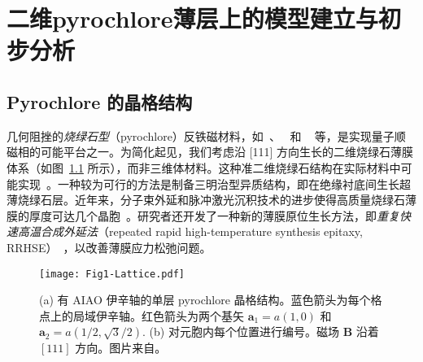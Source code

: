 \chapter{二维pyrochlore薄层上的模型建立与初步分析}
\label{chap:pyrochlore_model}
    \section{Pyrochlore 的晶格结构}
        几何阻挫的\emph{烧绿石型}（pyrochlore）反铁磁材料，如~\cite{welch2022MagneticStructure}、~\cite{kancko2023StructuralSpinglass} 和 ~\cite{he2021NeutronScattering} 等，是实现量子顺磁相的可能平台之一。为简化起见，我们考虑沿 [111] 方向生长的二维烧绿石薄膜体系（如图~\ref{fig:pyrochlore_lattice} 所示），而非三维体材料。这种准二维烧绿石结构在实际材料中可能实现~\cite{liu2024chiralspinliquidlikestatepyrochlore}。一种较为可行的方法是制备三明治型异质结构，即在绝缘衬底间生长超薄烧绿石层。近年来，分子束外延和脉冲激光沉积技术的进步使得高质量烧绿石薄膜的厚度可达几个晶胞~\cite{fujita2016AllinalloutMagnetic}。研究者还开发了一种新的薄膜原位生长方法，即\emph{重复快速高温合成外延法}（repeated rapid high-temperature synthesis epitaxy, RRHSE）~\cite{kim2019InoperandoSpectroscopic,kim2020StrainEngineeringMagnetic}，以改善薄膜应力松弛问题。

        \begin{figure}
            \centering
            \texttt{[image: Fig1-Lattice.pdf]}
            \caption{(a) 有 AIAO 伊辛轴的单层 pyrochlore 晶格结构。蓝色箭头为每个格点上的局域伊辛轴。红色箭头为两个基矢 $\bm{a}_1=a(1,0)$ 和 $\bm{a}_2=a(1/2,\sqrt{3}/2)$. (b) 对元胞内每个位置进行编号。磁场 $\bm{B}$ 沿着 $[111]$ 方向。图片来自\cite{lu2024Spin}。}
            \label{fig:pyrochlore_lattice}
        \end{figure}

